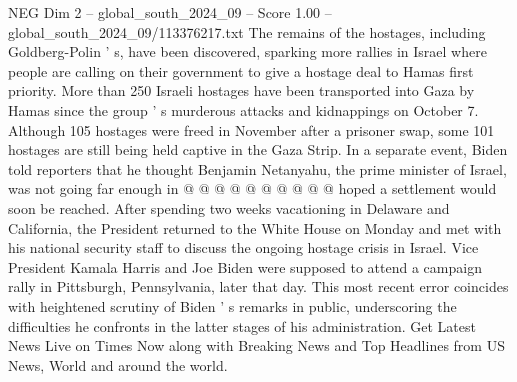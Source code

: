 \begin{textsample}{NEG Dim 2 – global\_south\_2024\_09 – Score 1.00 – global\_south\_2024\_09/113376217.txt}
The remains of the hostages, including Goldberg-Polin ' s, have been discovered, sparking more rallies in Israel where people are calling on their government to give a hostage deal to Hamas first priority.
More than 250 Israeli hostages have been transported into Gaza by Hamas since the group ' s murderous attacks and kidnappings on October 7.
Although 105 hostages were freed in November after a prisoner swap, some 101 hostages are still being held captive in the Gaza Strip.
In a separate event, Biden told reporters that he thought Benjamin Netanyahu, the prime minister of Israel, was not going far enough in @ @ @ @ @ @ @ @ @ @ hoped a settlement would soon be reached.
After spending two weeks vacationing in Delaware and California, the President returned to the White House on Monday and met with his national security staff to discuss the ongoing hostage crisis in Israel.
Vice President Kamala Harris and Joe Biden were supposed to attend a campaign rally in Pittsburgh, Pennsylvania, later that day.
This most recent error coincides with heightened scrutiny of Biden ' s remarks in public, underscoring the difficulties he confronts in the latter stages of his administration.
Get Latest News Live on Times Now along with Breaking News and Top Headlines from US News, World and around the world.

\end{textsample}
